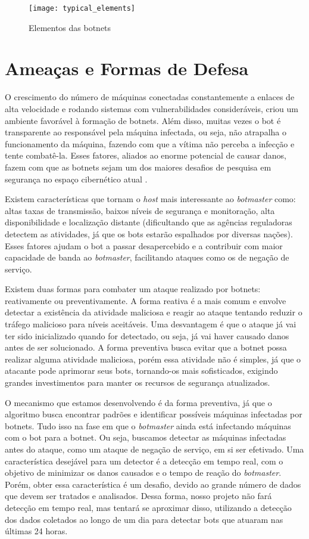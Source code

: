 \begin{figure}
\texttt{[image: typical\_elements]}
\caption[Elementos das botnets]{Elementos das botnets \citep{silva2013botnets}} \label{fig:typical_elements}
\end{figure}

\section{Ameaças e Formas de Defesa}
O crescimento do número de máquinas conectadas constantemente a enlaces de alta velocidade e rodando sistemas com vulnerabilidades consideráveis, criou um ambiente favorável à formação de botnets. Além disso, muitas vezes o bot é transparente ao responsável pela máquina infectada, ou seja, não atrapalha o funcionamento da máquina, fazendo com que a vítima não perceba a infecção e tente combatê-la. Esses fatores, aliados ao enorme potencial de causar danos, fazem com que as botnets sejam um dos maiores desafios de pesquisa em segurança no espaço cibernético atual \citep{soltani2014survey}.

Existem características que tornam o \textit{host} mais interessante ao \textit{botmaster} como: altas taxas de transmissão, baixos níveis de segurança e monitoração, alta disponibilidade e localização distante (dificultando que as agências reguladoras detectem as atividades, já que os bots estarão espalhados por diversas nações). Esses fatores ajudam o bot a passar desapercebido e a contribuir com maior capacidade de banda ao \textit{botmaster}, facilitando ataques como os de negação de serviço.

Existem duas formas para combater um ataque realizado por botnets: reativamente ou preventivamente. A forma reativa é a mais comum e envolve detectar a existência da atividade maliciosa e reagir ao ataque tentando reduzir o tráfego malicioso para níveis aceitáveis. Uma desvantagem é que o ataque já vai ter sido inicializado quando for detectado, ou seja, já vai haver causado danos antes de ser solucionado. A forma preventiva busca evitar que a botnet possa realizar alguma atividade maliciosa, porém essa atividade não é simples, já que o atacante pode aprimorar seus bots, tornando-os mais sofisticados, exigindo grandes investimentos para manter os recursos de segurança atualizados.

O mecanismo que estamos desenvolvendo é da forma preventiva, já que o algoritmo busca encontrar padrões e identificar possíveis máquinas infectadas por botnets. Tudo isso na fase em que o \textit{botmaster} ainda está infectando máquinas com o bot para a botnet. Ou seja, buscamos detectar as máquinas infectadas antes do ataque, como um ataque de negação de serviço, em si ser efetivado. Uma característica desejável para um detector é a detecção em tempo real, com o objetivo de minimizar os danos causados e o tempo de reação do \textit{botmaster}. Porém, obter essa característica é um desafio, devido ao grande número de dados que devem ser tratados e analisados. Dessa forma, nosso projeto não fará detecção em tempo real, mas tentará se aproximar disso, utilizando a detecção dos dados coletados ao longo de um dia para detectar bots que atuaram nas últimas 24 horas.

